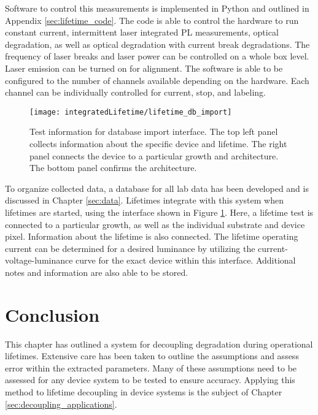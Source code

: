 \documentclass[../thesis.tex]{subfiles}
\begin{document}
Software to control this measurements is implemented in Python and outlined in Appendix \ref{sec:lifetime_code}.
The code is able to control the hardware to run constant current, intermittent laser integrated PL measurements, optical degradation, as well as optical degradation with current break degradations.
The frequency of laser breaks and laser power can be controlled on a whole box level.  
Laser emission can be turned on for alignment.
The software is able to be configured to the number of channels available depending on the hardware.
Each channel can be individually controlled for current, stop, and labeling.  

\begin{figure}[ht]
    \centering
    \texttt{[image: integratedLifetime/lifetime\_db\_import]}
\caption{Test information for database import interface.  The top left panel collects information about the specific device and lifetime.  The right panel connects the device to a particular growth and architecture.  The bottom panel confirms the architecture.}
\label{fig:lifetime_db_import}
\end{figure}

To organize collected data, a database for all lab data has been developed and is discussed in Chapter \ref{sec:data}.
Lifetimes integrate with this system when lifetimes are started, using the interface shown in Figure \ref{fig:lifetime_db_import}.
Here, a lifetime test is connected to a particular growth, as well as the individual substrate and device pixel. 
Information about the lifetime is also connected.  
The lifetime operating current can be determined for a desired luminance by utilizing the current-voltage-luminance curve for the exact device within this interface.  
Additional notes and information are also able to be stored.

\section{Conclusion}
This chapter has outlined a system for decoupling degradation during operational lifetimes.
Extensive care has been taken to outline the assumptions and assess error within the extracted parameters.  
Many of these assumptions need to be assessed for any device system to be tested to ensure accuracy.  
Applying this method to lifetime decoupling in device systems is the subject of Chapter \ref{sec:decoupling_applications}.
\end{document}

